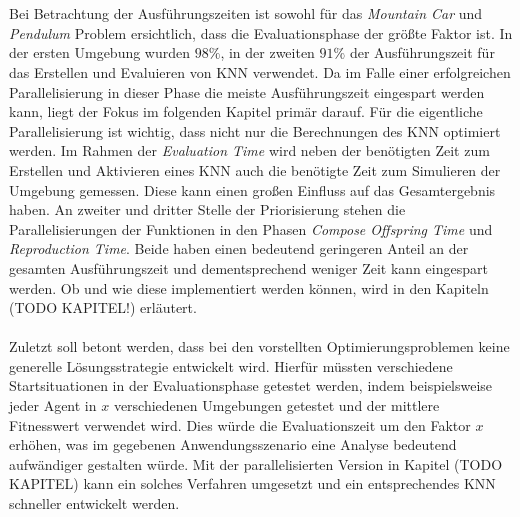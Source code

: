 \\\\
Bei Betrachtung der Ausführungszeiten ist sowohl für das \emph{Mountain Car} und \emph{Pendulum} Problem ersichtlich, dass die Evaluationsphase der größte Faktor ist. In der ersten Umgebung wurden $98\%$, in der zweiten $91\%$ der Ausführungszeit für das Erstellen und Evaluieren von \ac{KNN} verwendet. Da im Falle einer erfolgreichen Parallelisierung in dieser Phase die meiste Ausführungszeit eingespart werden kann, liegt der Fokus im folgenden Kapitel primär darauf. Für die eigentliche Parallelisierung ist wichtig, dass nicht nur die Berechnungen des \ac{KNN} optimiert werden. Im Rahmen der \emph{Evaluation Time} wird neben der benötigten Zeit zum Erstellen und Aktivieren eines \ac{KNN} auch die benötigte Zeit zum Simulieren der Umgebung gemessen. Diese kann einen großen Einfluss auf das Gesamtergebnis haben. An zweiter und dritter Stelle der Priorisierung stehen die Parallelisierungen der Funktionen in den Phasen \emph{Compose Offspring Time} und \emph{Reproduction Time}. Beide haben einen bedeutend geringeren Anteil an der gesamten Ausführungszeit und dementsprechend weniger Zeit kann eingespart werden. Ob und wie diese implementiert werden können, wird in den Kapiteln (TODO KAPITEL!) erläutert. %
\\\\
Zuletzt soll betont werden, dass bei den vorstellten Optimierungsproblemen keine generelle Lösungsstrategie entwickelt wird. Hierfür müssten verschiedene Startsituationen in der Evaluationsphase getestet werden, indem beispielsweise jeder Agent in $x$ verschiedenen Umgebungen getestet und der mittlere Fitnesswert verwendet wird. Dies würde die Evaluationszeit um den Faktor $x$ erhöhen, was im gegebenen Anwendungsszenario eine Analyse bedeutend aufwändiger gestalten würde. Mit der parallelisierten Version in Kapitel (TODO KAPITEL) kann ein solches Verfahren umgesetzt und ein entsprechendes \ac{KNN} schneller entwickelt werden.


